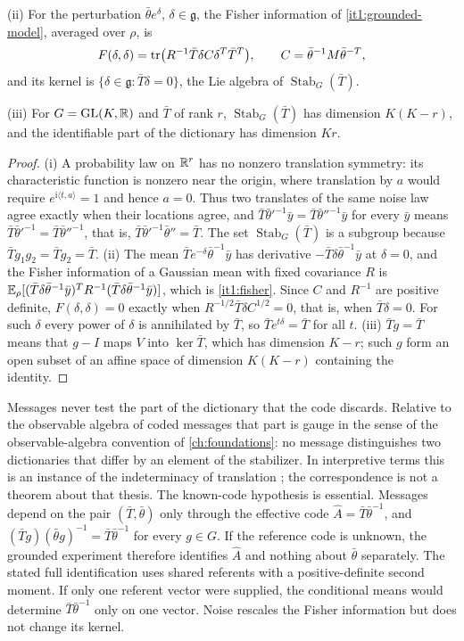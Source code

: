 \textup{(ii)} For the perturbation $\bar\theta e^{\delta}$, $\delta\in\mathfrak g$, the Fisher information of \cref{it1:grounded-model}, averaged over $\rho$, is
\begin{equation}
F(\delta,\delta)=\operatorname{tr}\bigl(R^{-1}\bar T\delta C\delta^T\bar T^T\bigr),\qquad C=\bar\theta^{-1}M\bar\theta^{-T},
\label{it1:fisher}
\end{equation}
and its kernel is $\{\delta\in\mathfrak g:\bar T\delta=0\}$, the Lie algebra of $\operatorname{Stab}_G(\bar T)$.

\textup{(iii)} For $G=\mathrm{GL}(K,\mathbb R)$ and $\bar T$ of rank $r$, $\operatorname{Stab}_G(\bar T)$ has dimension $K(K-r)$, and the identifiable part of the dictionary has dimension $Kr$.
\begin{proof}
(i) A probability law on $\mathbb R^r$ has no nonzero translation symmetry: its characteristic function is nonzero near the origin, where translation by $a$ would require $e^{\mathrm i\langle t,a\rangle}=1$ and hence $a=0$. Thus two translates of the same noise law agree exactly when their locations agree, and $\bar T\bar\theta'^{-1}\bar y=\bar T\bar\theta''^{-1}\bar y$ for every $\bar y$ means $\bar T\bar\theta'^{-1}=\bar T\bar\theta''^{-1}$, that is, $\bar T\bar\theta'^{-1}\bar\theta''=\bar T$. The set $\operatorname{Stab}_G(\bar T)$ is a subgroup because $\bar Tg_1g_2=\bar Tg_2=\bar T$. (ii) The mean $\bar T e^{-\delta}\bar\theta^{-1}\bar y$ has derivative $-\bar T\delta\bar\theta^{-1}\bar y$ at $\delta=0$, and the Fisher information of a Gaussian mean with fixed covariance $R$ is $\mathbb E_\rho[(\bar T\delta\bar\theta^{-1}\bar y)^TR^{-1}(\bar T\delta\bar\theta^{-1}\bar y)]$, which is \cref{it1:fisher}. Since $C$ and $R^{-1}$ are positive definite, $F(\delta,\delta)=0$ exactly when $R^{-1/2}\bar T\delta C^{1/2}=0$, that is, when $\bar T\delta=0$. For such $\delta$ every power of $\delta$ is annihilated by $\bar T$, so $\bar Te^{t\delta}=\bar T$ for all $t$. (iii) $\bar Tg=\bar T$ means that $g-I$ maps $V$ into $\ker\bar T$, which has dimension $K-r$; such $g$ form an open subset of an affine space of dimension $K(K-r)$ containing the identity.
\end{proof}

Messages never test the part of the dictionary that the code discards. Relative to the observable algebra of coded messages that part is gauge in the sense of the observable-algebra convention of \cref{ch:foundations}: no message distinguishes two dictionaries that differ by an element of the stabilizer. In interpretive terms this is an instance of the indeterminacy of translation \citep{Quine1960}; the correspondence is not a theorem about that thesis. The known-code hypothesis is essential. Messages depend on the pair $(\bar T,\bar\theta)$ only through the effective code $\hat A=\bar T\bar\theta^{-1}$, and $(\bar Tg)(\bar\theta g)^{-1}=\bar T\bar\theta^{-1}$ for every $g\in G$. If the reference code is unknown, the grounded experiment therefore identifies $\hat A$ and nothing about $\bar\theta$ separately. The stated full identification uses shared referents with a positive-definite second moment. If only one referent vector were supplied, the conditional means would determine $\bar T\bar\theta^{-1}$ only on one vector. Noise rescales the Fisher information but does not change its kernel.

